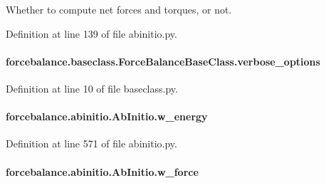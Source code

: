 Whether to compute net forces and torques, or not. 



Definition at line 139 of file abinitio.\-py.

\hypertarget{classforcebalance_1_1baseclass_1_1ForceBalanceBaseClass_a8088e1e20cbd6bc175fb9c9fe9fa0f18}{
\paragraph[{verbose\-\_\-options}]{\setlength{\rightskip}{0pt plus 5cm}forcebalance.\-baseclass.\-Force\-Balance\-Base\-Class.\-verbose\-\_\-options\hspace{0.3cm}{\ttfamily [inherited]}}}\label{classforcebalance_1_1baseclass_1_1ForceBalanceBaseClass_a8088e1e20cbd6bc175fb9c9fe9fa0f18}


Definition at line 10 of file baseclass.\-py.

\hypertarget{classforcebalance_1_1abinitio_1_1AbInitio_aa7f09e2ffc1253844c9f0736caf9b9e5}{
\paragraph[{w\-\_\-energy}]{\setlength{\rightskip}{0pt plus 5cm}forcebalance.\-abinitio.\-Ab\-Initio.\-w\-\_\-energy\hspace{0.3cm}{\ttfamily [inherited]}}}\label{classforcebalance_1_1abinitio_1_1AbInitio_aa7f09e2ffc1253844c9f0736caf9b9e5}


Definition at line 571 of file abinitio.\-py.

\hypertarget{classforcebalance_1_1abinitio_1_1AbInitio_a4ec4863edbb6ea4a28777de905d621d3}{
\paragraph[{w\-\_\-force}]{\setlength{\rightskip}{0pt plus 5cm}forcebalance.\-abinitio.\-Ab\-Initio.\-w\-\_\-force\hspace{0.3cm}{\ttfamily [inherited]}}}\label{classforcebalance_1_1abinitio_1_1AbInitio_a4ec4863edbb6ea4a28777de905d621d3}



